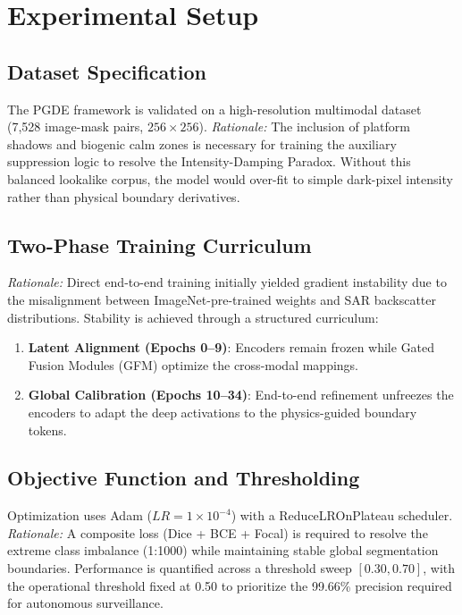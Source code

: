 \section{Experimental Setup}
\subsection{Dataset Specification}
The PGDE framework is validated on a high-resolution multimodal dataset (7,528 image-mask pairs, $256 \times 256$). \textit{Rationale:} The inclusion of platform shadows and biogenic calm zones is necessary for training the auxiliary suppression logic to resolve the Intensity-Damping Paradox. Without this balanced lookalike corpus, the model would over-fit to simple dark-pixel intensity rather than physical boundary derivatives.

\subsection{Two-Phase Training Curriculum}
\textit{Rationale:} Direct end-to-end training initially yielded gradient instability due to the misalignment between ImageNet-pre-trained weights and SAR backscatter distributions. Stability is achieved through a structured curriculum:
\begin{enumerate}
    \item \textbf{Latent Alignment (Epochs 0--9)}: Encoders remain frozen while Gated Fusion Modules (GFM) optimize the cross-modal mappings.
    \item \textbf{Global Calibration (Epochs 10--34)}: End-to-end refinement unfreezes the encoders to adapt the deep activations to the physics-guided boundary tokens.
\end{enumerate}

\subsection{Objective Function and Thresholding}
Optimization uses Adam ($LR=1 \times 10^{-4}$) with a ReduceLROnPlateau scheduler. \textit{Rationale:} A composite loss (Dice + BCE + Focal) is required to resolve the extreme class imbalance (1:1000) while maintaining stable global segmentation boundaries. Performance is quantified across a threshold sweep $[0.30, 0.70]$, with the operational threshold fixed at 0.50 to prioritize the 99.66\% precision required for autonomous surveillance.
